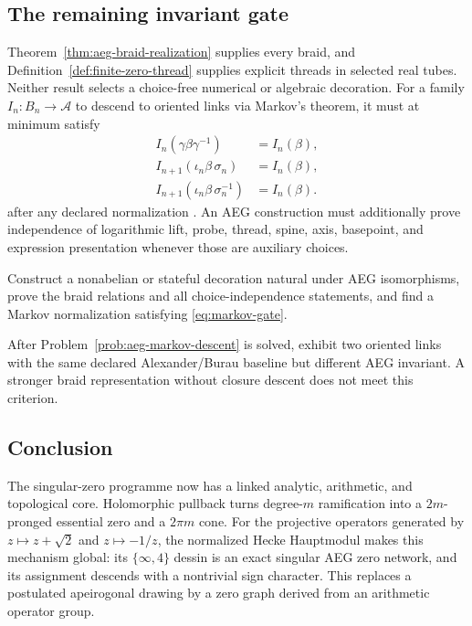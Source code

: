 \subsection{The remaining invariant gate}

Theorem~\ref{thm:aeg-braid-realization} supplies every braid, and
Definition~\ref{def:finite-zero-thread} supplies explicit threads in selected real
tubes.  Neither result selects a choice-free numerical or algebraic decoration.
For a family $I_n:B_n\to\mathcal A$ to descend to oriented links via Markov's
theorem, it must at minimum satisfy
\begin{equation}
\begin{aligned}
 I_n(\gamma\beta\gamma^{-1})&=I_n(\beta),\\
 I_{n+1}(\iota_n\beta\,\sigma_n)&=I_n(\beta),\\
 I_{n+1}(\iota_n\beta\,\sigma_n^{-1})&=I_n(\beta).
\end{aligned}
\label{eq:markov-gate}
\end{equation}
after any declared normalization \cite{Birman1974Braids}.  An AEG construction
must additionally prove independence of logarithmic lift, probe, thread, spine,
axis, basepoint, and expression presentation whenever those are auxiliary choices.

\begin{problem}
\label{prob:aeg-markov-descent}
Construct a nonabelian or stateful decoration natural under AEG isomorphisms, prove
the braid relations and all choice-independence statements, and find a Markov
normalization satisfying \eqref{eq:markov-gate}.
\end{problem}

\begin{problem}
\label{prob:beyond-alexander-burau}
After Problem~\ref{prob:aeg-markov-descent} is solved, exhibit two oriented links
with the same declared Alexander/Burau baseline but different AEG invariant.  A
stronger braid representation without closure descent does not meet this criterion.
\end{problem}

\subsection{Conclusion}

The singular-zero programme now has a linked analytic, arithmetic, and topological
core.  Holomorphic pullback turns degree-$m$ ramification into a $2m$-pronged
essential zero and a $2\pi m$ cone.  For the projective operators generated by
$z\mapsto z+\sqrt2$ and $z\mapsto-1/z$, the normalized Hecke Hauptmodul makes this
mechanism global: its $\{\infty,4\}$ dessin is an exact singular AEG zero network,
and its assignment descends with a nontrivial sign character.  This replaces a
postulated apeirogonal drawing by a zero graph derived from an arithmetic operator
group.

